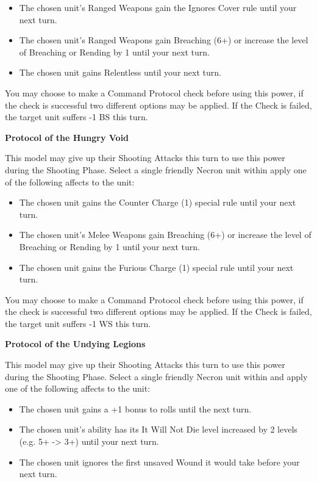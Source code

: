 \begin{multicols}{2}
\begin{itemize}
	\itemsep 0pt
	\item The chosen unit's Ranged Weapons gain the Ignores Cover rule until your next turn.
	\item The chosen unit's Ranged Weapons gain Breaching (6+) or increase the level of Breaching or Rending by 1 until your next turn.
	\item The chosen unit gains Relentless until your next turn.
\end{itemize}

You may choose to make a Command Protocol check before using this power, if the check is successful two different options may be applied. If the Check is failed, the target unit suffers -1 BS this turn.

\textbf{Protocol of the Hungry Void}

This model may give up their Shooting Attacks this turn to use this power during the Shooting Phase. Select a single friendly Necron unit within  apply one of the following affects to the unit:

\begin{itemize}
	\itemsep 0pt
	\item The chosen unit gains the Counter Charge (1) special rule until your next turn.
	\item The chosen unit's Melee Weapons gain Breaching (6+) or increase the level of Breaching or Rending by 1 until your next turn.
	\item The chosen unit gains the Furious Charge (1) special rule until your next turn.
\end{itemize}

You may choose to make a Command Protocol check before using this power, if the check is successful two different options may be applied. If the Check is failed, the target unit suffers -1 WS this turn.

\textbf{Protocol of the Undying Legions}

This model may give up their Shooting Attacks this turn to use this power during the Shooting Phase. Select a single friendly Necron unit within  and apply one of the following affects to the unit:

\begin{itemize}
	\itemsep 0pt
	\item The chosen unit gains a +1 bonus to  rolls until the next turn.
	\item The chosen unit's  ability has its It Will Not Die level increased by 2 levels (e.g. 5+ -> 3+) until  your next turn.
	\item The chosen unit ignores the first unsaved Wound it would take before your next turn.
\end{itemize}


\end{multicols}
